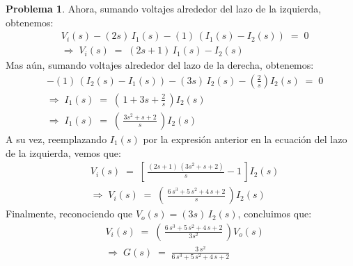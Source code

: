\documentclass[ a4paper, twoside, 11pt]{article}
\theoremstyle{definition}
\newtheorem{problem}[definition]{Problema}
\begin{document}
\begin{problem}
Ahora, sumando voltajes alrededor del lazo de la izquierda, obtenemos: 
\begin{align*}
& V_i(s) - (2s) \, I_1(s) - (1) \, ( I_1(s) - I_2(s) ) \; = \; 0 \\
& \Longrightarrow \; 
V_i(s) \; = \; ( 2s + 1 ) \, I_1(s) - I_2(s)
\end{align*}
Mas a\'un, sumando voltajes alrededor del lazo de la derecha, obtenemos: 
\begin{align*}
& - (1) \, ( I_2(s) - I_1(s) ) - (3s) \, I_2(s) - \left( \frac{2}{s} \right) I_2(s) \; = \; 0 \\
& \Longrightarrow \; 
I_1(s) \; = \; \left( \, 1 + 3s + \frac{2}{s} \, \right) I_2(s) \\
& \Longrightarrow \; 
I_1(s) \; = \; \left( \, \frac{ 3s^2 + s + 2 }{s} \, \right) I_2(s)
\end{align*}
A su vez, reemplazando $I_1(s)$ por la expresi\'on anterior en la ecuaci\'on del lazo de la izquierda, vemos que: 
\begin{align*}
& V_i(s) \; = \; 
\left[ \, \frac{ ( 2s + 1 ) \, ( 3s^2 + s + 2 ) }{s} - 1 \, \right] I_2(s) \\
& \Longrightarrow \; 
V_i(s) \; = \; 
\left( \, \frac{ 6 \, s^3 + 5 \, s^2 + 4 \, s + 2 }{s} \, \right) I_2(s)
\end{align*}
Finalmente, reconociendo que $V_o(s) = (3s) \, I_2(s)$, concluimos que: 
\begin{align*}
& V_i(s) \; = \; 
\left( \, \frac{ 6 \, s^3 + 5 \, s^2 + 4 \, s + 2 }{3s^2} \, \right) V_o(s) \\
& \Longrightarrow \; G(s) \; = \; 
\frac{ 3 \, s^2 }{ 6 \, s^3 + 5 \, s^2 + 4 \, s + 2 }
\end{align*}

\end{problem}
\vspace{\baselineskip}
\end{document}
